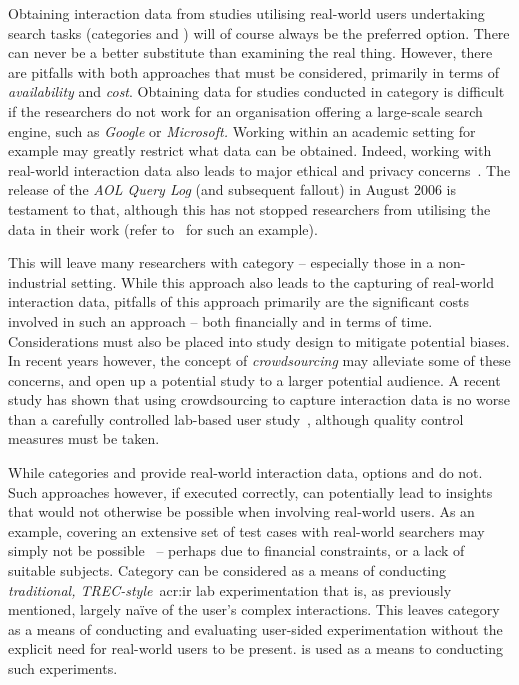 Obtaining interaction data from studies utilising real-world users undertaking search tasks (categories  and ) will of course always be the preferred option. There can never be a better substitute than examining the real thing. However, there are pitfalls with both approaches that must be considered, primarily in terms of \emph{availability} and \emph{cost}. Obtaining data for studies conducted in category  is difficult if the researchers do not work for an organisation offering a large-scale search engine, such as \emph{Google} or \emph{Microsoft.} Working within an academic setting for example may greatly restrict what data can be obtained. Indeed, working with real-world interaction data also leads to major ethical and privacy concerns~\citep{korolova2009aol_query_log_privacy}. The release of the \emph{AOL Query Log} (and subsequent fallout) in August 2006 is testament to that, although this has not stopped researchers from utilising the data in their work (refer to~\cite{brenes2009aol_query_log} for such an example).

This will leave many researchers with category  -- especially those in a non-industrial setting. While this approach also leads to the capturing of real-world interaction data, pitfalls of this approach primarily are the significant costs involved in such an approach -- both financially and in terms of time. Considerations must also be placed into study design to mitigate potential biases. In recent years however, the concept of \emph{crowdsourcing} may alleviate some of these concerns, and open up a potential study to a larger potential audience. A recent study has shown that using crowdsourcing to capture interaction data is no worse than a carefully controlled lab-based user study~\citep{zuccon2013crowdsourcing_comparisons}, although quality control measures must be taken.

While categories  and  provide real-world interaction data, options  and  do not. Such approaches however, if executed correctly, can potentially lead to insights that would not otherwise be possible when involving real-world users. As an example, covering an extensive set of test cases with real-world searchers may simply not be possible~\citep{keskustalo2008user_simulation} -- perhaps due to financial constraints, or a lack of suitable subjects. Category  can be considered as a means of conducting \emph{traditional, TREC-style}~\gls{acr:ir} lab experimentation that is, as previously mentioned, largely na\"{i}ve of the user's complex interactions. This leaves category  as a means of conducting and evaluating user-sided experimentation without the explicit need for real-world users to be present.  is used as a means to conducting such experiments.

